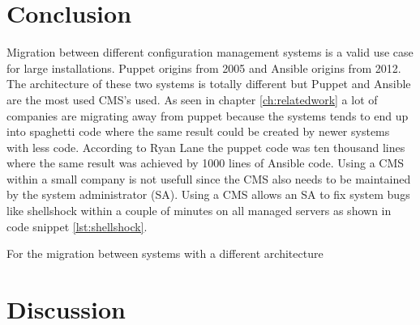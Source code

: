\section{Conclusion}\label{sec:conclusion}
Migration between different configuration management systems is a valid use case for large installations. Puppet origins from 2005 and Ansible origins from 2012. The architecture of these two systems is totally different but Puppet and Ansible are the most used CMS's used. As seen in chapter \ref{ch:relatedwork} a lot of companies are migrating away from puppet because the systems tends to end up into spaghetti code \cite{movingawayfrompuppet} where the same result could be created by newer systems with less code. According to Ryan Lane \cite{movingawayfrompuppet} the puppet code was ten thousand lines where the same result was achieved by 1000 lines of Ansible code. Using a CMS within a small company is not usefull since the CMS also needs to be maintained by the system administrator (SA). Using a CMS allows an SA to fix system bugs like shellshock within a couple of minutes on all managed servers as shown in code snippet \ref{lst:shellshock}.

For the migration between systems with a different architecture




\section{Discussion}\label{sec:discussion}


